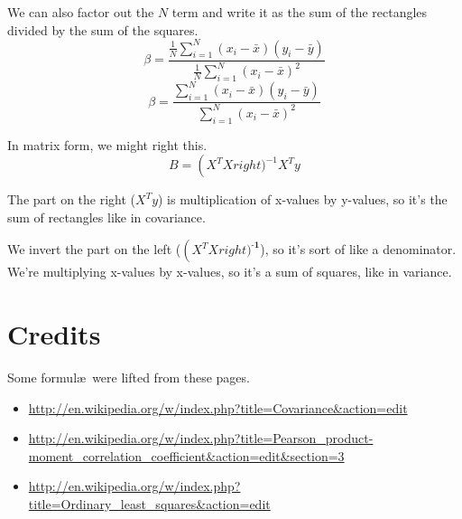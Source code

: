 \documentclass{article}
\begin{document}
We can also factor out the $N$ term and write it as the sum of the rectangles divided by the sum of the squares.
$$ \beta = \frac
{\frac{1}{N}\sum_{i=1}^{N}\left( x_{i}-\bar{x} \right) \left( y_{i}-\bar{y} \right)}
{\frac{1}{N}\sum_{i=1}^{N}\left( x_{i}-\bar{x} \right)^2}
$$
$$ \beta = \frac
{\sum_{i=1}^{N}\left( x_{i}-\bar{x} \right) \left( y_{i}-\bar{y} \right)}
{\sum_{i=1}^{N}\left( x_{i}-\bar{x} \right)^2}
$$

In matrix form, we might right this.
$$B = \left(X^TXright)^{-1}X^Ty$$

The part on the right ($X^Ty$) is multiplication of x-values by y-values,
so it's the sum of rectangles like in covariance.

We invert the part on the left ($\left(X^TXright)^\textbf{-1}$),
so it's sort of like a denominator. We're multiplying x-values by
x-values, so it's a sum of squares, like in variance.

\section{Credits}
Some formul\ae\ were lifted from these pages.
\begin{itemize}
\item \url{http://en.wikipedia.org/w/index.php?title=Covariance&action=edit}
\item \url{http://en.wikipedia.org/w/index.php?title=Pearson_product-moment_correlation_coefficient&action=edit&section=3}
\item \url{http://en.wikipedia.org/w/index.php?title=Ordinary_least_squares&action=edit}
\end{itemize}
\end{document}
